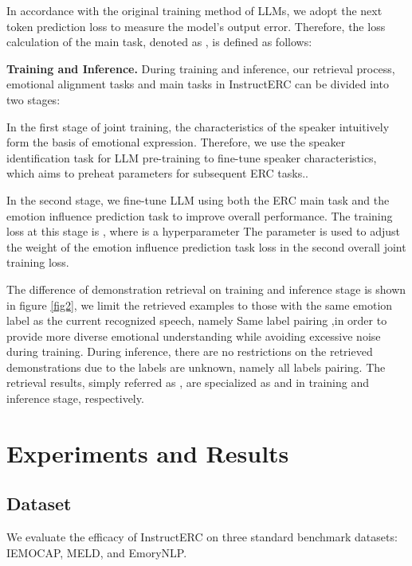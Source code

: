 \documentclass[conference]{IEEEtran}
\begin{document}
In accordance with the original training method of LLMs, we adopt the next token prediction loss to measure the model's output error. Therefore, the loss calculation of the main task, denoted as , is defined as follows:






\textbf{Training and Inference.}
During training and inference, our retrieval process, emotional alignment tasks and main tasks in InstructERC can be divided into two stages:




In the first stage of joint training, the characteristics of the speaker intuitively form the basis of emotional expression. Therefore, we use the speaker identification task for LLM pre-training to fine-tune speaker characteristics, which aims to preheat parameters for subsequent ERC tasks.. 

In the second stage, we fine-tune LLM using both the ERC main task and the emotion influence prediction task to improve overall performance. The training loss at this stage is ,  where  is a hyperparameter The parameter  is used to adjust the weight of the emotion influence prediction task loss in the second overall joint training loss.


The difference of demonstration retrieval on training and inference stage is shown in figure \ref{fig2}, we limit the retrieved examples to those with the same emotion label as the current recognized speech, namely Same label pairing ,in order to provide more diverse emotional understanding while avoiding excessive noise during training. During inference, there are no restrictions on the retrieved demonstrations due to the labels are unknown, namely all labels pairing. The retrieval results, simply referred as , are specialized as   and  in training and inference stage, respectively.

\section{Experiments and Results}

\subsection{Dataset}
We evaluate the efficacy of InstructERC on three standard benchmark datasets: IEMOCAP, MELD, and EmoryNLP.
\end{document}
